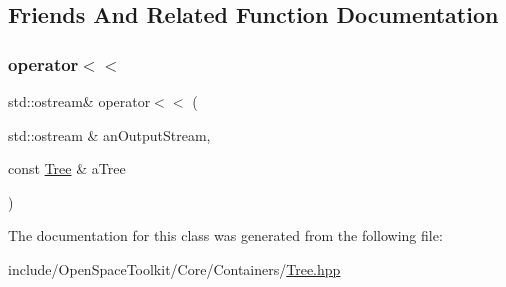 \subsection{Friends And Related Function Documentation}
\mbox{\label{classostk_1_1core_1_1ctnr_1_1_tree_aca74cf66509d8f31b83b1c100cb00bea}} 
\subsubsection{\texorpdfstring{operator$<$$<$}{operator<<}}
{\footnotesize\ttfamily std\+::ostream\& operator$<$$<$ (\begin{DoxyParamCaption}\item[{std\+::ostream \&}]{an\+Output\+Stream,  }\item[{const \hyperlink{classostk_1_1core_1_1ctnr_1_1_tree}{Tree} \&}]{a\+Tree }\end{DoxyParamCaption})\hspace{0.3cm}{\ttfamily [friend]}}



The documentation for this class was generated from the following file\+:\begin{DoxyCompactItemize}
\item 
include/\+Open\+Space\+Toolkit/\+Core/\+Containers/\hyperlink{_tree_8hpp}{Tree.\+hpp}\end{DoxyCompactItemize}
